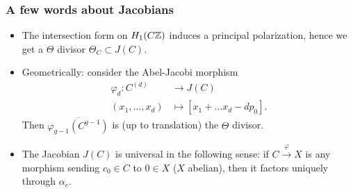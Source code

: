 \begin{frame}
\frametitle{A few words about Jacobians}

\begin{itemize}
	\item The intersection form on $H_1(C\mathbb{Z})$ induces a principal polarization, hence we get a \alert{$\Theta$ divisor} $\Theta_C \subset J(C)$.
	\item Geometrically: consider the Abel-Jacobi morphism
	\begin{align*}
	\varphi_d: C^{(d)} &\to J(C) \\
	(x_1,\ldots,x_d) &\mapsto [x_1+\ldots x_d-dp_0].
	\end{align*}
	Then $\overline{\varphi_{g-1}(C^{g-1})}$ is (up to translation) the $\Theta$ divisor. \pause
	\item The Jacobian $J(C)$ is universal in the following sense: if $C \xrightarrow{\varphi} X$ is any morphism sending $c_0 \in C$ to $0 \in X$ ($X$ abelian), then it factors uniquely through $\alpha_c$.
\end{itemize}
\end{frame}